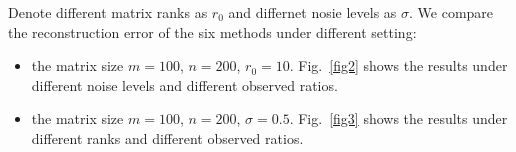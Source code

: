 \documentclass{article}
\begin{document}
{Denote different matrix ranks as $r_0$ and differnet nosie levels as $\sigma$.
We compare the reconstruction error of the six methods under different setting:
\begin{itemize}
    \item  the matrix size $m =100$, $n=200$, $r_0 = 10$. Fig.~\ref{fig2} shows the results under different noise levels and different observed ratios.
    \item  the matrix size $m =100$, $n=200$, $\sigma = 0.5$. Fig.~\ref{fig3} shows the results under different ranks and different observed ratios.
\end{itemize}

\begin{figure}[htbp]
    \centering
    \quad\quad
    \\
    \quad\quad
    \\

\end{figure}}
\end{document}
